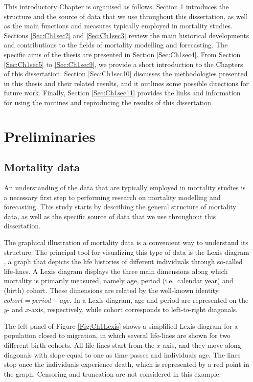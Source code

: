\documentclass[Thesis]{subfiles}
\begin{document}
This introductory Chapter is organised as follows. Section \ref{Sec:Ch1sec1} introduces the structure and the source of data that we use throughout this dissertation, as well as the main functions and measures typically employed in mortality studies. Sections \ref{Sec:Ch1sec2} and \ref{Sec:Ch1sec3} review the main historical developments and contributions to the fields of mortality modelling and forecasting. The specific aims of the thesis are presented in Section \ref{Sec:Ch1sec4}. From Section \ref{Sec:Ch1sec5} to \ref{Sec:Ch1sec9}, we provide a short introduction to the Chapters of this dissertation. Section \ref{Sec:Ch1sec10} discusses the methodologies presented in this thesis and their related results, and it outlines some possible directions for future work. Finally, Section \ref{Sec:Ch1sec11} provides the links and information for using the routines and reproducing the results of this dissertation.

\section{Preliminaries}\label{Sec:Ch1sec1}

\subsection*{Mortality data}\label{Subsec:Ch1subsec1.1}
An understanding of the data that are typically employed in mortality studies is a necessary first step to performing research on mortality modelling and forecasting. This study starts by describing the general structure of mortality data, as well as the specific source of data that we use throughout this dissertation. 
 
The graphical illustration of mortality data is a convenient way to understand its structure. The principal tool for visualizing this type of data is the Lexis diagram \citep{lexis1875einleitung}, a graph that depicts the life histories of different individuals through so-called life-lines. A Lexis diagram displays the three main dimensions along which mortality is primarily measured, namely age, period (i.e.~calendar year) and (birth) cohort. These dimensions are related by the well-known identity $cohort = period - age$. In a Lexis diagram, age and period are represented on the $y$- and $x$-axis, respectively, while cohort corresponds to left-to-right diagonals.

The left panel of Figure \ref{Fig:Ch1Lexis} shows a simplified Lexis diagram for a population closed to migration, in which several life-lines are shown for two different birth cohorts. All life-lines start from the $x$-axis, and they move along diagonals with slope equal to one as time passes and individuals age. The lines stop once the individuals experience death, which is represented by a red point in the graph. Censoring and truncation are not considered in this example.
\end{document}
